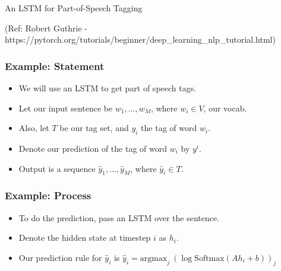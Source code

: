 \begin{frame}[fragile]\frametitle{}

\begin{center}
{\Large An LSTM for Part-of-Speech Tagging}

(Ref:  Robert Guthrie -  https://pytorch.org/tutorials/beginner/deep\_learning\_nlp\_tutorial.html)
\end{center}
\end{frame}

\begin{frame}[fragile]
\frametitle{Example: Statement}
\begin{itemize}
\item We will use an LSTM to get part of speech tags. 
\item Let our input sentence be $w_1, \dots, w_M$, where $w_i \in V$, our vocab. 
\item Also, let $T$ be our tag set, and $y_i$ the tag of word $w_i$. 
\item Denote our prediction of the tag of word $w_i$ by $y^i$.
\item Output is a sequence $\hat{y}_1, \dots, \hat{y}_M$, where $\hat{y}_i \in T$.
\end{itemize}
     
\end{frame} 

\begin{frame}[fragile]
\frametitle{Example: Process}
\begin{itemize}
\item To do the prediction, pass an LSTM over the sentence. 
\item Denote the hidden state at timestep $i$ as $h_i$. 
\item Our prediction rule for $\hat{y}_i$ is $\hat{y}_i = \text{argmax}_j \  (\log \text{Softmax}(Ah_i + b))_j$
\end{itemize}
     
\end{frame} 

